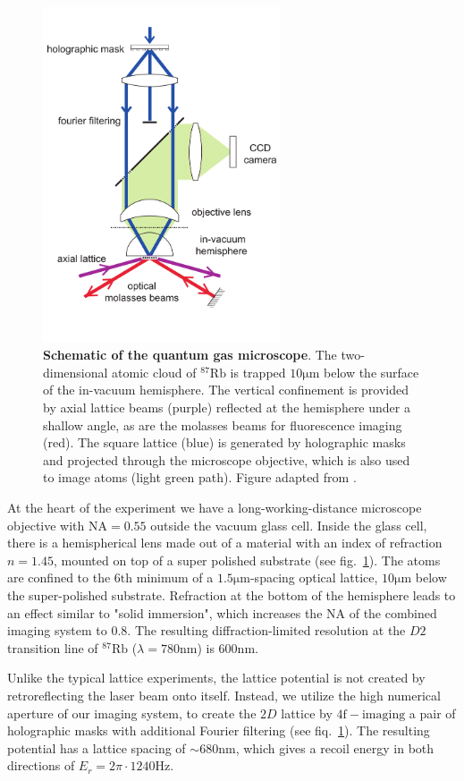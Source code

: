 \begin{figure}[t]
	\centering
	\includegraphics[width=70mm]{figures/QGM_setup.pdf}
	\caption{{\bf Schematic of the quantum gas microscope}. The two-dimensional atomic cloud of $^{87}\mathrm{Rb}$ is trapped $10\mathrm{\mu m}$ below the surface of the in-vacuum hemisphere. The vertical confinement is provided by axial lattice beams (purple) reflected at the hemisphere under a shallow angle, as are the molasses beams for fluorescence imaging (red). The square lattice (blue) is generated by holographic masks and projected through the microscope objective, which is also used to image atoms (light green path). Figure adapted from \cite{Bakr2009}.}
	\label{fig:QGM_QGM}
\end{figure}

At the heart of the experiment we have a long-working-distance microscope objective with $\textrm{NA} = 0.55$ outside the vacuum glass cell. Inside the glass cell, there is a hemispherical lens made out of a material with an index of refraction $n=1.45$, mounted on top of a super polished substrate (see fig.~\ref{fig:QGM_QGM}). The atoms are confined to the $6\mathrm{th}$ minimum of a $1.5\mathrm{\mu m}$-spacing optical lattice, $10\mathrm{\mu m}$ below the super-polished substrate. Refraction at the bottom of the hemisphere leads to an effect similar to "solid immersion", which increases the NA of the combined imaging system to $0.8$. The resulting diffraction-limited resolution at the $D2$ transition line of $^{87}\mathrm{Rb}$ ($\lambda = 780\mathrm{nm}$) is $600\mathrm{nm}$. 

Unlike the typical lattice experiments, the lattice potential is not created by retroreflecting the laser beam onto itself. Instead, we utilize the high numerical aperture of our imaging system, to create the $2D$ lattice by $4\mathrm{f-imaging}$ a pair of holographic masks with additional Fourier filtering (see fiq.~\ref{fig:QGM_QGM}). The resulting potential has a lattice spacing of $\sim680\mathrm{nm}$, which gives a recoil energy in both directions of $E_r = 2\pi \cdot 1240\mathrm{Hz}$.

